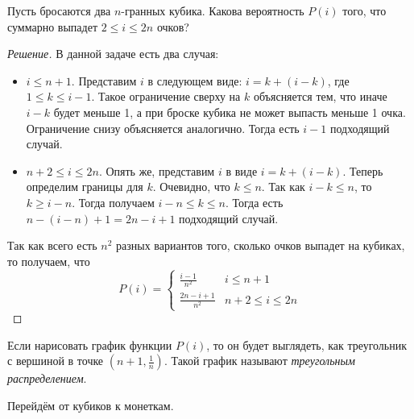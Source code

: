 \documentclass[a4paper,12pt]{article}
\begin{document}
\begin{problem}
	Пусть бросаются два \(n\)-гранных кубика. Какова вероятность \(P(i)\) того, что суммарно выпадет \(2 \leq i \leq 2n\) очков?
\end{problem}
\begin{proof}[Решение]
	В данной задаче есть два случая:
	\begin{itemize}
		\item \(i \leq n + 1\). Представим \(i\) в следующем виде: \(i = k + (i - k)\), где \(1 \leq k \leq i - 1\). Такое ограничение сверху на \(k\) объясняется тем, что иначе \(i - k\) будет меньше 1, а при броске кубика не может выпасть меньше 1 очка. Ограничение снизу объясняется аналогично. Тогда есть \(i - 1\) подходящий случай.
		\item \(n + 2 \leq i \leq 2n\). Опять же, представим \(i\) в виде \(i = k + (i - k)\). Теперь определим границы для \(k\). Очевидно, что \(k \leq n\). Так как \(i - k \leq n\), то \(k \geq i - n\). Тогда получаем \(i - n \leq k \leq n\). Тогда есть \(n - (i - n) + 1 = 2n - i + 1\) подходящий случай.
	\end{itemize}
	Так как всего есть \(n^2\) разных вариантов того, сколько очков выпадет на кубиках, то получаем, что
	\[P(i) = \begin{cases}
	\frac{i - 1}{n^2} & i \leq n + 1 \\
	\frac{2n - i + 1}{n^2} & n + 2 \leq i \leq 2n
	\end{cases}\]
\end{proof}
\begin{remark}
	Если нарисовать график функции \(P(i)\), то он будет выглядеть, как треугольник с вершиной в точке \(\left(n + 1, \frac{1}{n}\right)\). Такой график называют \emph{треугольным распределением}.
\end{remark}

Перейдём от кубиков к монеткам.
\end{document}
